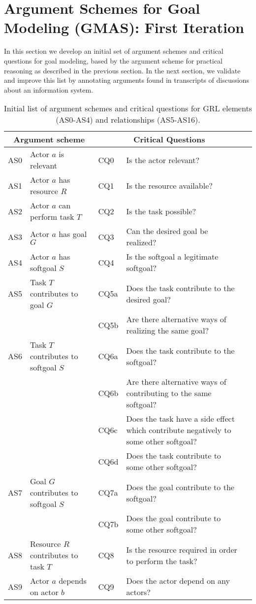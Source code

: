 \section{Argument Schemes for Goal Modeling (GMAS): First Iteration}
\label{sect:gmas}

In this section we develop an initial set of argument schemes and critical questions for goal modeling, based by the argument scheme for practical reasoning as described in the previous section. In the next section, we validate and improve this list by annotating arguments found in transcripts of discussions about an information system.

\begin{table*}[h]
\centering
\begin{tabular}{|l|l|l|l|l|}
\hline
\multicolumn{2}{|c|}{\textbf{Argument scheme}} & \multicolumn{2}{c|}{\textbf{Critical Questions}}\\
\hline
AS0 & Actor $a$ is relevant & CQ0 &Is the actor relevant?\\
\hline
AS1 & Actor $a$ has resource $R$ & CQ1 &Is the resource available?\\
\hline
AS2 & Actor $a$ can perform task $T$ & CQ2 &Is the task possible?\\
\hline
AS3 & Actor $a$ has goal $G$ & CQ3 & Can the desired goal be realized?\\
\hline
AS4 & Actor $a$ has softgoal $S$ & CQ4 & Is the softgoal a legitimate softgoal?\\
\hline
\hline
AS5 & Task $T$ contributes to goal $G$ & CQ5a & Does the task contribute to the desired goal?\\
& & CQ5b & Are there alternative ways of realizing the same goal?\\
\hline
AS6 & Task $T$ contributes to softgoal $S$& CQ6a & Does the task contribute to the softgoal?\\
&& CQ6b & Are there alternative ways of contributing to the same softgoal? \\
&& CQ6c & Does the task have a side effect which contribute negatively to some other softgoal?\\
&& CQ6d & Does the task contribute to some other softgoal?\\
\hline
AS7 & Goal $G$ contributes to softgoal $S$ & CQ7a & Does the goal contribute to the softgoal?\\
&& CQ7b & Does the goal contribute to some other softgoal?\\
\hline
AS8 & Resource $R$ contributes to task $T$ & CQ8 & Is the resource required in order to perform the task?\\
\hline
AS9 & Actor $a$ depends on actor $b$ & CQ9 & Does the actor depend on any actors?\\
\hline
\end{tabular}
\caption{Initial list of argument schemes and critical questions for GRL elements (AS0-AS4) and relationships (AS5-AS16).}
\label{table:argument-schemes}
\end{table*}

